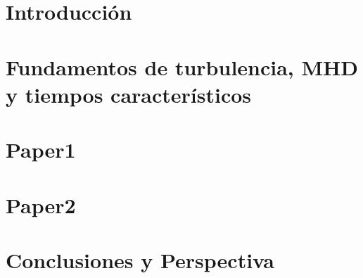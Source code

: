 \documentclass[12pt]{book}
\begin{document}
\tableofcontents
\mainmatter
\chapter[Introducción]{Introducción}
\label{ch:introduccion}



\chapter[Fundamentos de turbulencia, MHD y tiempos característicos]{Fundamentos de turbulencia,  MHD y tiempos característicos}
\label{ch:fundamentos}


\chapter[Paper1]{Paper1}
\label{ch:P1}


\chapter[Paper2]{Paper2}
\label{ch:P2}


\chapter[Conclusiones y Perspectiva]{Conclusiones y Perspectiva}
\label{ch:conclusiones}








\end{document}
